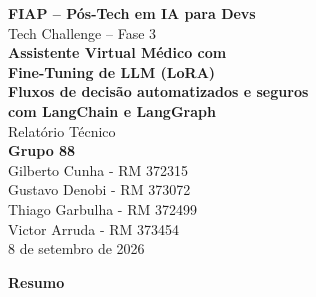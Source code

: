 \documentclass[12pt,a4paper]{article}
\begin{document}
\begin{titlepage}
\thispagestyle{empty}
\begin{center}
\vspace*{2.2cm}

{\large\bfseries FIAP -- Pós-Tech em IA para Devs}\\[0.5cm]
{\normalsize Tech Challenge -- Fase 3}\\[2.6cm]

{\LARGE\bfseries Assistente Virtual Médico com\\[0.25cm]
Fine-Tuning de LLM (LoRA)}\\[0.6cm]
{\large\bfseries Fluxos de decisão automatizados e seguros\\ com LangChain e LangGraph}\\[2.4cm]

{\normalsize Relatório Técnico}\\[2.4cm]

{\large\bfseries Grupo 88}\\[0.7cm]
{\normalsize Gilberto Cunha - RM 372315}\\[0.35cm]
{\normalsize Gustavo Denobi - RM 373072}\\[0.35cm]
{\normalsize Thiago Garbulha - RM 372499}\\[0.35cm]
{\normalsize Victor Arruda - RM 373454}\\[2.6cm]

{\normalsize 8 de setembro de 2026}

\end{center}
\end{titlepage}

\setcounter{page}{1}

\begin{center}
\textbf{Resumo}
\end{center}
\end{document}

